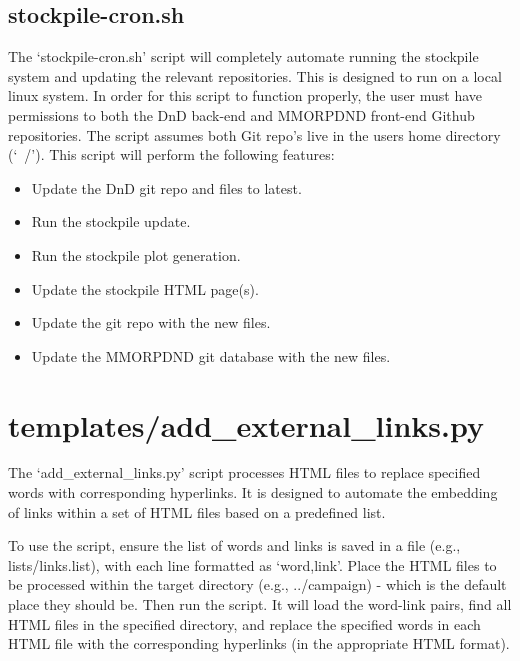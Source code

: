 \subsection{stockpile-cron.sh \label{stockpile-cron.sh}}

The `stockpile-cron.sh' script will completely automate running the stockpile system and updating the relevant repositories. This is designed to run on a local linux system. In order for this script to function properly, the user must have permissions to both the DnD back-end and MMORPDND front-end Github repositories. The script assumes both Git repo's live in the users home directory (`~/'). This script will perform the following features:

\begin{itemize}
\item Update the DnD git repo and files to latest.
\item Run the stockpile update.
\item Run the stockpile plot generation.
\item Update the stockpile HTML page(s).
\item Update the git repo with the new files.
\item Update the MMORPDND git database with the new files.
\end{itemize}
















\section{templates/add\_external\_links.py}

The `add\_external\_links.py' script processes HTML files to replace specified words with corresponding hyperlinks. It is designed to automate the embedding of links within a set of HTML files based on a predefined list. 

To use the script, ensure the list of words and links is saved in a file (e.g., lists/links.list), with each line formatted as `word,link'. Place the HTML files to be processed within the target directory (e.g., ../campaign) - which is the default place they should be. Then run the script. It will load the word-link pairs, find all HTML files in the specified directory, and replace the specified words in each HTML file with the corresponding hyperlinks (in the appropriate HTML format).










